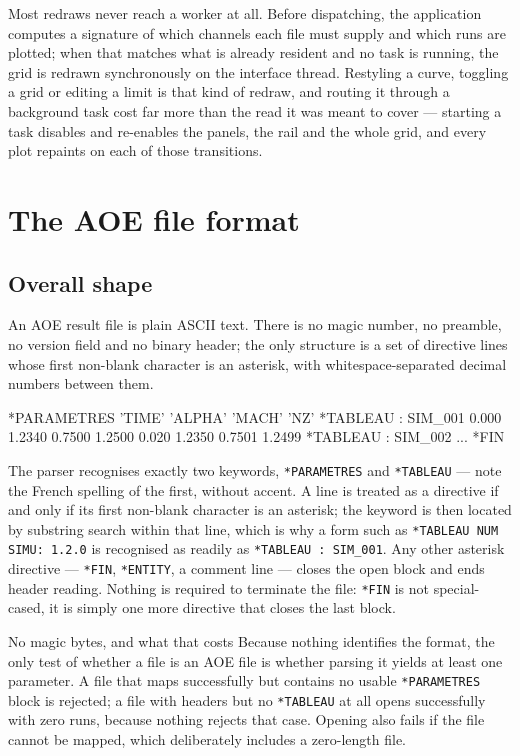 \documentclass[11pt,a4paper,oneside]{report}
\newcommand{\code}[1]{\texttt{#1}}
\begin{document}
Most redraws never reach a worker at all. Before dispatching, the application
computes a signature of which channels each file must supply and which runs are
plotted; when that matches what is already resident and no task is running, the
grid is redrawn synchronously on the interface thread. Restyling a curve,
toggling a grid or editing a limit is that kind of redraw, and routing it through
a background task cost far more than the read it was meant to cover --- starting
a task disables and re-enables the panels, the rail and the whole grid, and every
plot repaints on each of those transitions.

\chapter{The AOE file format}

\section{Overall shape}

An AOE result file is plain ASCII text. There is no magic number, no preamble, no
version field and no binary header; the only structure is a set of directive
lines whose first non-blank character is an asterisk, with whitespace-separated
decimal numbers between them.

\begin{aoecode}
*PARAMETRES
 'TIME'   'ALPHA'  'MACH'  'NZ'
*TABLEAU : SIM_001
 0.000 1.2340 0.7500 1.2500
 0.020 1.2350 0.7501 1.2499
*TABLEAU : SIM_002
 ...
*FIN
\end{aoecode}

The parser recognises exactly two keywords, \code{*PARAMETRES} and
\code{*TABLEAU} --- note the French spelling of the first, without accent. A line
is treated as a directive if and only if its first non-blank character is an
asterisk; the keyword is then located by substring search within that line, which
is why a form such as \code{*TABLEAU NUM SIMU: 1.2.0} is recognised as readily as
\code{*TABLEAU : SIM\_001}. Any other asterisk directive --- \code{*FIN},
\code{*ENTITY}, a comment line --- closes the open block and ends header reading.
Nothing is required to terminate the file: \code{*FIN} is not special-cased, it
is simply one more directive that closes the last block.

\begin{aoenote}{No magic bytes, and what that costs}
Because nothing identifies the format, the only test of whether a file is an AOE
file is whether parsing it yields at least one parameter. A file that maps
successfully but contains no usable \code{*PARAMETRES} block is rejected; a file
with headers but no \code{*TABLEAU} at all opens successfully with zero runs,
because nothing rejects that case. Opening also fails if the file cannot be
mapped, which deliberately includes a zero-length file.
\end{aoenote}
\end{document}
